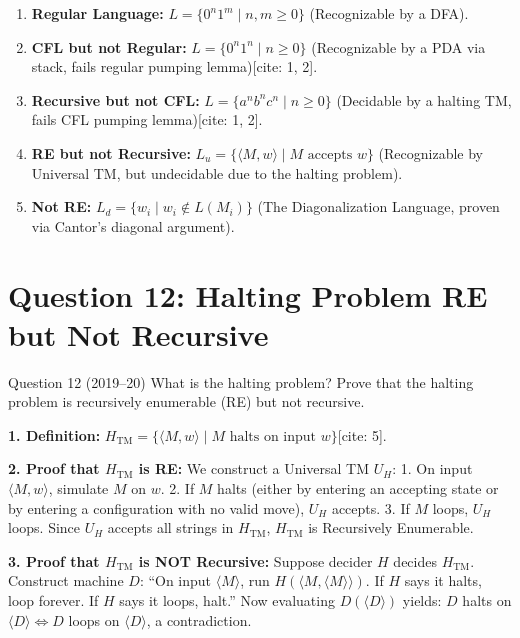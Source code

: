 \documentclass[11pt,a4paper]{article}
\begin{document}
\begin{solutionbox}
\begin{enumerate}[label=(\alph*), leftmargin=*]
    \item \textbf{Regular Language:} $L = \{0^n 1^m \mid n, m \ge 0\}$ (Recognizable by a DFA).
    \item \textbf{CFL but not Regular:} $L = \{0^n 1^n \mid n \ge 0\}$ (Recognizable by a PDA via stack, fails regular pumping lemma)[cite: 1, 2].
    \item \textbf{Recursive but not CFL:} $L = \{a^n b^n c^n \mid n \ge 0\}$ (Decidable by a halting TM, fails CFL pumping lemma)[cite: 1, 2].
    \item \textbf{RE but not Recursive:} $L_u = \{\langle M, w \rangle \mid M \text{ accepts } w\}$ (Recognizable by Universal TM, but undecidable due to the halting problem).
    \item \textbf{Not RE:} $L_d = \{w_i \mid w_i \notin L(M_i)\}$ (The Diagonalization Language, proven via Cantor's diagonal argument).
\end{enumerate}
\end{solutionbox}

\section{Question 12: Halting Problem RE but Not Recursive}
\begin{questionbox}{Question 12 (2019--20)}
What is the halting problem? Prove that the halting problem is recursively enumerable (RE) but not recursive.
\end{questionbox}

\begin{solutionbox}
\textbf{1. Definition:} $H_{\text{TM}} = \{\langle M, w \rangle \mid M \text{ halts on input } w\}$[cite: 5].

\textbf{2. Proof that $H_{\text{TM}}$ is RE:}
We construct a Universal TM $U_H$:
1. On input $\langle M, w \rangle$, simulate $M$ on $w$.
2. If $M$ halts (either by entering an accepting state or by entering a configuration with no valid move), $U_H$ accepts.
3. If $M$ loops, $U_H$ loops.
Since $U_H$ accepts all strings in $H_{\text{TM}}$, $H_{\text{TM}}$ is Recursively Enumerable.

\textbf{3. Proof that $H_{\text{TM}}$ is NOT Recursive:}
Suppose decider $H$ decides $H_{\text{TM}}$. Construct machine $D$:
``On input $\langle M \rangle$, run $H(\langle M, \langle M \rangle \rangle)$. If $H$ says it halts, loop forever. If $H$ says it loops, halt.''
Now evaluating $D(\langle D \rangle)$ yields: $D$ halts on $\langle D \rangle \iff D$ loops on $\langle D \rangle$, a contradiction.
\end{solutionbox}
\end{document}
